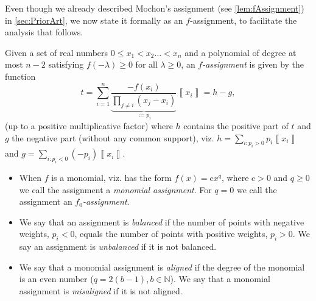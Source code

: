 \documentclass{article}
\begin{document}
Even though we already described Mochon's assignment (see \cref{lem:fAssignment}) in \cref{sec:PriorArt}, we now state it formally as an $f$-assignment, to facilitate the analysis that follows.
%
\begin{definition}[$f$-assignments]
  Given a set of real numbers $0\le x_{1}<x_{2}\dots<x_{n}$ and a
  polynomial of degree at most $n-2$ satisfying $f(-\lambda)\ge0$
  for all $\lambda\ge0$, an \emph{$f$-assignment} is given by
  the function
  $$
    t=\sum_{i=1}^{n}\underbrace{\frac{-f(x_{i})}{\prod_{j\neq i}(x_{j}-x_{i})}}_{:=p_{i}}\left\llbracket x_{i}\right\rrbracket =h-g,
  $$
  (up to a positive multiplicative factor) where $h$ contains the positive
  part of $t$ and $g$ the negative part (without any common support),
  viz. $h=\sum_{i:p_{i}>0}p_{i}\left\llbracket x_{i}\right\rrbracket $
  and $g=\sum_{i:p_{i}<0}\left(-p_{i}\right)\left\llbracket x_{i}\right\rrbracket $.
  \label{def:f_assignment-f_0_assignment-balanced-m_kmonomial}
  \begin{itemize}
    \item When $f$ is a monomial, viz. has the form $f(x)=\text{c}x^{q}$, where $\text{c} >0$ and $q\geq 0$ we call
          the assignment a \emph{monomial assignment}. For $q=0$ we call the assignment an \emph{$f_{0}$-assignment}.
    \item We say that an assignment is \emph{balanced} if the number of points with
          negative weights, $p_{i}<0$, equals the number of points with positive
          weights, $p_{i}>0$. We say an assignment is \emph{unbalanced} if
          it is not balanced.
    \item We say that a monomial assignment is \emph{aligned} if the degree of the monomial is an even number ($q=2(b-1), b\in\mathbb{N}$). We say that a monomial assignment is \emph{misaligned} if it is not aligned.
  \end{itemize}
\end{definition}
\end{document}

